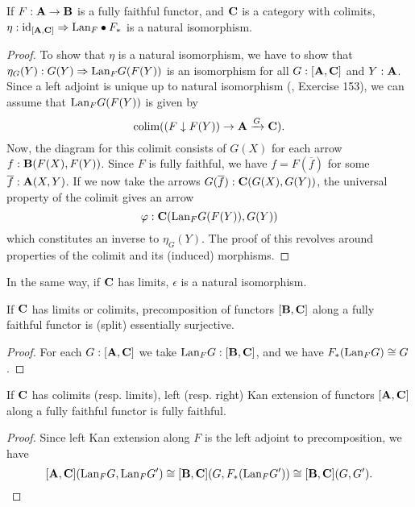 \begin{lemma}\label{lem:lan-precomp-iso}
  If $ F : \mathbf{A} \to \mathbf{B} $ is a fully faithful functor, and $ \mathbf{C} $ is a category with colimits, $ \eta: \text{id}_{[\mathbf{A}, \mathbf{C}]} \Rightarrow \text{Lan}_{F} \bullet F_* $ is a natural isomorphism.
\end{lemma}
\begin{proof}
  To show that $ \eta $ is a natural isomorphism, we have to show that $ \eta_G(Y): G(Y) \Rightarrow \text{Lan}_{F}G(F(Y)) $ is an isomorphism for all $ G: [\mathbf{A}, \mathbf{C}] $ and $ Y: \mathbf{A} $. Since a left adjoint is unique up to natural isomorphism (\autocite{CT4P}, Exercise 153), we can assume that $ \text{Lan}_{F}G(F(Y)) $ is given by
  \[ \text{colim} ((F \downarrow F(Y)) \to \mathbf{A} \xrightarrow G \mathbf{C}). \]
  Now, the diagram for this colimit consists of $ G(X) $ for each arrow $ f: \mathbf{B}(F(X), F(Y)) $. Since $ F $ is fully faithful, we have $ f = F(\overline f) $ for some $ \overline f: \mathbf{A}(X, Y) $. If we now take the arrows $ G(\overline f): \mathbf{C}(G(X), G(Y)) $, the universal property of the colimit gives an arrow
  \[ \varphi: \mathbf{C}(\text{Lan}_{F}G(F(Y)), G(Y)) \]
  which constitutes an inverse to $ \eta_G(Y) $. The proof of this revolves around properties of the colimit and its (induced) morphisms.
\end{proof}

\begin{remark}
  In the same way, if $ \mathbf{C} $ has limits, $ \epsilon $ is a natural isomorphism.
\end{remark}

\begin{corollary}\label{cor:surjective-precomposition}
  If $ \mathbf{C} $ has limits or colimits, precomposition of functors $ [\mathbf{B}, \mathbf{C}] $ along a fully faithful functor is (split) essentially surjective.
\end{corollary}
\begin{proof}
  For each $ G: [\mathbf{A}, \mathbf{C}] $ we take $ \text{Lan}_{F}G: [\mathbf{B}, \mathbf{C}] $, and we have $ F_*(\text{Lan}_{F}G) \cong G $.
\end{proof}

\begin{corollary}
  If $ \mathbf{C} $ has colimits (resp. limits), left (resp. right) Kan extension of functors $ [\mathbf{A}, \mathbf{C}] $ along a fully faithful functor is fully faithful.
\end{corollary}
\begin{proof}
  Since left Kan extension along $ F $ is the left adjoint to precomposition, we have
  \[ [\mathbf{A}, \mathbf{C}](\text{Lan}_{F}G, \text{Lan}_{F}G^\prime) \cong [\mathbf{B}, \mathbf{C}](G, F_*(\text{Lan}_{F}G^\prime)) \cong [\mathbf{B}, \mathbf{C}](G, G^\prime). \]
\end{proof}

